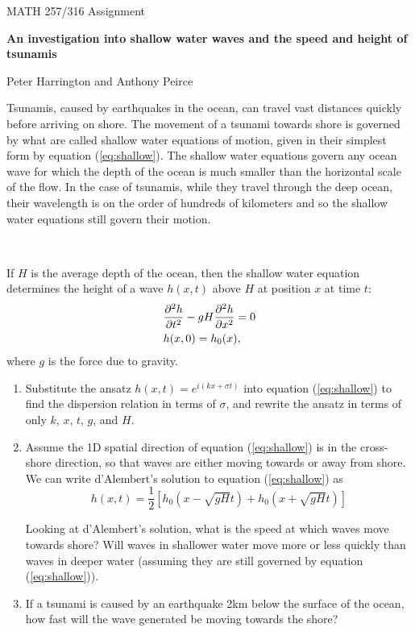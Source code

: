 \documentclass[12pt]{article}
\begin{document}
\pagestyle{empty}

\begin{center}
{\Large MATH 257/316 Assignment}\textbf{\ \\[0pt]
}

\textbf{An investigation into shallow water waves and the speed and height of tsunamis}


Peter Harrington and Anthony Peirce
\end{center}


Tsunamis, caused by earthquakes in the ocean, can travel vast distances quickly before arriving on shore. The movement of a tsunami towards shore is governed by what are called shallow water equations of motion, given in their simplest form by equation (\ref{eq:shallow}). The shallow water equations govern any ocean wave for which the depth of the ocean is much smaller than the horizontal scale of the flow. In the case of tsunamis, while they travel through the deep ocean, their wavelength is on the order of hundreds of kilometers and so the shallow water equations still govern their motion.

\

If $H$ is the average depth of the ocean, then the shallow water equation determines the height of a wave $h(x,t)$ above $H$ at position $x$ at time $t$: 
\begin{align}
&\frac{\partial^2 h}{\partial t^2}-gH\frac{\partial^2 h}{\partial x^2}=0\label{eq:shallow}\\ 
&h(x,0)=h_0(x)\notag,
\end{align}
where $g$ is the force due to gravity.

\begin{enumerate}
\item Substitute the ansatz $h(x,t)=e^{i(kx+\sigma t)}$ into equation (\ref{eq:shallow}) to find the dispersion relation in terms of $\sigma$, and rewrite the ansatz in terms of only $k$, $x$, $t$, $g$, and $H$.

\item Assume the 1D spatial direction of equation (\ref{eq:shallow}) is in the cross-shore direction, so that waves are either moving towards or away from shore. We can write d'Alembert's solution to equation (\ref{eq:shallow}) as \[h(x,t)=\frac{1}{2}\left[ h_0(x-\sqrt{gH}t)+h_0(x+\sqrt{gH}t)\right]\]

Looking at d'Alembert's solution, what is the speed at which waves move towards shore? Will waves in shallower water move more or less quickly than waves in deeper water (assuming they are still governed by equation (\ref{eq:shallow})).
\item If a tsunami is caused by an earthquake 2km below the surface of the ocean, how fast will the wave generated be moving towards the shore?
\end{enumerate}
\end{document}
